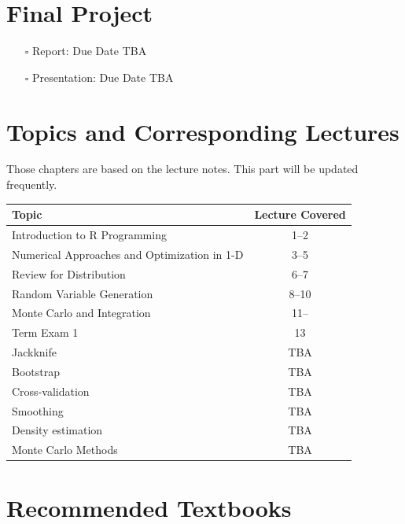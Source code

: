 \documentclass[
  letterpaper,
  DIV=11,
  numbers=noendperiod]{scrreprt}
\providecommand{\tightlist}{%
  \setlength{\itemsep}{0pt}\setlength{\parskip}{0pt}}
\begin{document}
\section*{Final Project}\label{final-project}


\begin{itemize}
\tightlist
\item[$\square$]
  Report: Due Date TBA
\item[$\square$]
  Presentation: Due Date TBA
\end{itemize}

\section*{Topics and Corresponding
Lectures}\label{topics-and-corresponding-lectures}


Those chapters are based on the lecture notes. This part will be updated
frequently.

\begin{longtable}[]{@{}lc@{}}
\toprule\noalign{}
Topic & Lecture Covered \\
\midrule\noalign{}
\endhead
\bottomrule\noalign{}
\endlastfoot
Introduction to R Programming & 1--2 \\
Numerical Approaches and Optimization in 1-D & 3--5 \\
Review for Distribution & 6--7 \\
Random Variable Generation & 8--10 \\
Monte Carlo and Integration & 11-- \\
Term Exam 1 & 13 \\
Jackknife & TBA \\
Bootstrap & TBA \\
Cross-validation & TBA \\
Smoothing & TBA \\
Density estimation & TBA \\
Monte Carlo Methods & TBA \\
\end{longtable}

\section*{Recommended Textbooks}\label{recommended-textbooks}
\end{document}
